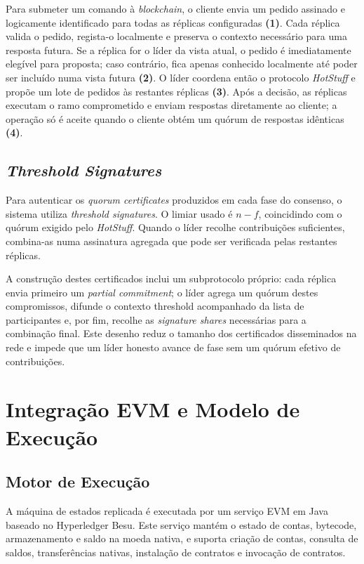 \documentclass[runningheads]{llncs}
\begin{document}
Para submeter um comando \`a \textit{blockchain}, o cliente envia um pedido assinado e logicamente identificado para todas as r\'eplicas configuradas \textbf{(1)}. Cada r\'eplica valida o pedido, regista-o localmente e preserva o contexto necess\'ario para uma resposta futura. Se a r\'eplica for o l\'ider da vista atual, o pedido \'e imediatamente eleg\'ivel para proposta; caso contr\'ario, fica apenas conhecido localmente at\'e poder ser inclu\'ido numa vista futura \textbf{(2)}. O l\'ider coordena ent\~ao o protocolo \textit{HotStuff} e prop\~oe um lote de pedidos \`as restantes r\'eplicas \textbf{(3)}. Ap\'os a decis\~ao, as r\'eplicas executam o ramo comprometido e enviam respostas diretamente ao cliente; a opera\c{c}\~ao s\'o \'e aceite quando o cliente obt\'em um qu\'orum de respostas id\^enticas \textbf{(4)}.

\subsection{\textit{Threshold Signatures}}
Para autenticar os \textit{quorum certificates} produzidos em cada fase do consenso, o sistema utiliza \textit{threshold signatures}. O limiar usado \'e \(n-f\), coincidindo com o qu\'orum exigido pelo \textit{HotStuff}. Quando o l\'ider recolhe contribui\c{c}\~oes suficientes, combina-as numa assinatura agregada que pode ser verificada pelas restantes r\'eplicas.

A constru\c{c}\~ao destes certificados inclui um subprotocolo pr\'oprio: cada r\'eplica envia primeiro um \textit{partial commitment}; o l\'ider agrega um qu\'orum destes compromissos, difunde o contexto threshold acompanhado da lista de participantes e, por fim, recolhe as \textit{signature shares} necess\'arias para a combina\c{c}\~ao final. Este desenho reduz o tamanho dos certificados disseminados na rede e impede que um l\'ider honesto avance de fase sem um qu\'orum efetivo de contribui\c{c}\~oes.

\section{Integra\c{c}\~ao EVM e Modelo de Execu\c{c}\~ao}

\subsection{Motor de Execu\c{c}\~ao}
A m\'aquina de estados replicada \'e executada por um servi\c{c}o EVM em Java baseado no Hyperledger Besu. Este servi\c{c}o mant\'em o estado de contas, bytecode, armazenamento e saldo na moeda nativa, e suporta cria\c{c}\~ao de contas, consulta de saldos, transfer\^encias nativas, instala\c{c}\~ao de contratos e invoca\c{c}\~ao de contratos.
\end{document}
